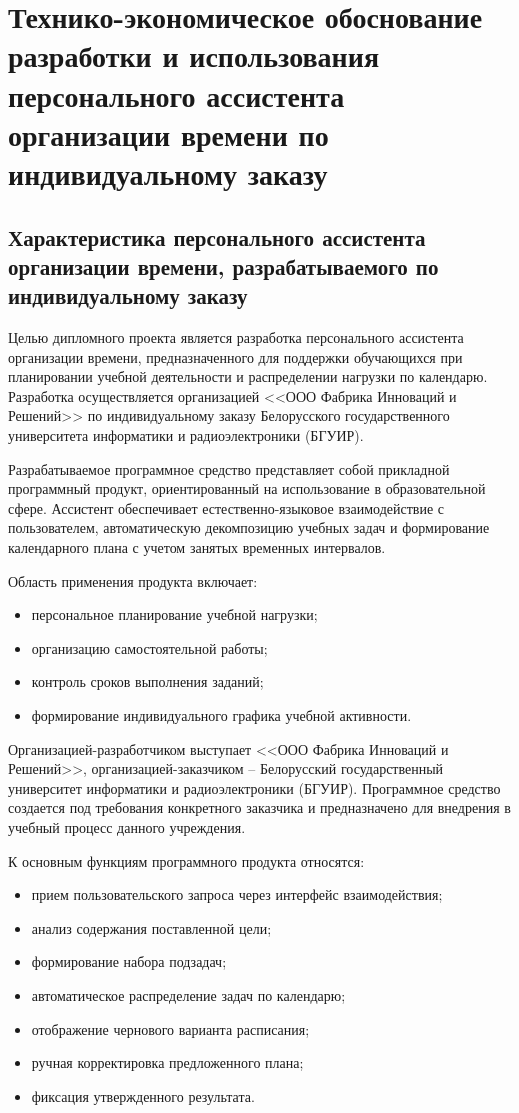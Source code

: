 \section{Технико-экономическое обоснование разработки и использования персонального ассистента организации времени по индивидуальному заказу}
\label{sec:economics}

\subsection{Характеристика персонального ассистента организации времени, разрабатываемого по индивидуальному заказу}

Целью дипломного проекта является разработка персонального ассистента организации времени, предназначенного для поддержки обучающихся при планировании учебной деятельности и распределении нагрузки по календарю. Разработка осуществляется организацией <<ООО Фабрика Инноваций и Решений>> по индивидуальному заказу Белорусского государственного университета информатики и радиоэлектроники (БГУИР).

Разрабатываемое программное средство представляет собой прикладной программный продукт, ориентированный на использование в образовательной сфере. Ассистент обеспечивает естественно-языковое взаимодействие с пользователем, автоматическую декомпозицию учебных задач и формирование календарного плана с учетом занятых временных интервалов.

Область применения продукта включает:
\begin{itemize}
    \item персональное планирование учебной нагрузки;
    \item организацию самостоятельной работы;
    \item контроль сроков выполнения заданий;
    \item формирование индивидуального графика учебной активности.
\end{itemize}

Организацией-разработчиком выступает <<ООО Фабрика Инноваций и Решений>>, организацией-заказчиком -- Белорусский государственный университет информатики и радиоэлектроники (БГУИР). Программное средство создается под требования конкретного заказчика и предназначено для внедрения в учебный процесс данного учреждения.

К основным функциям программного продукта относятся:
\begin{itemize}
    \item прием пользовательского запроса через интерфейс взаимодействия;
    \item анализ содержания поставленной цели;
    \item формирование набора подзадач;
    \item автоматическое распределение задач по календарю;
    \item отображение чернового варианта расписания;
    \item ручная корректировка предложенного плана;
    \item фиксация утвержденного результата.
\end{itemize}


